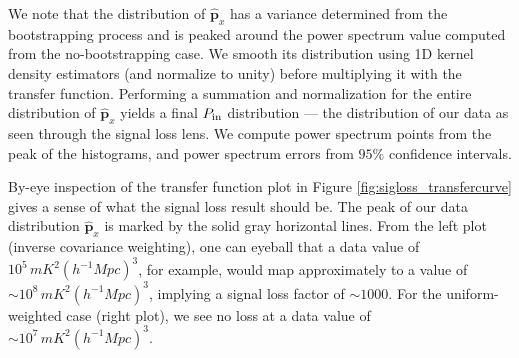 \documentclass[preprint2,numberedappendix,tighten]{aastex6}  %
\newcommand{\phat}{\widehat{\mathbf{p}}}
\begin{document}
We note that the distribution of $\phat_{x}$ has a variance determined from the bootstrapping process and is peaked around the power spectrum value computed from the no-bootstrapping case. We smooth its distribution using 1D kernel density estimators (and normalize to unity) before multiplying it with the transfer function. Performing a summation and normalization for the entire distribution of $\phat_{x}$ yields a final $P_{\rm in}$ distribution --- the distribution of our data as seen through the signal loss lens. We compute power spectrum points from the peak of the histograms, and power spectrum errors from $95\%$ confidence intervals. 

By-eye inspection of the transfer function plot in Figure \ref{fig:sigloss_transfercurve} gives a sense of what the signal loss result should be. The peak of our data distribution $
\widehat{\textbf{p}}_{x}$ is marked by the solid gray horizontal lines. From the left plot (inverse covariance weighting), one can eyeball that a data value of $10^{5} \, mK^{2} (h^{-1} Mpc)^{3}$, for example, would map approximately to a 
value of $\sim10^{8} \, mK^{2} (h^{-1} Mpc)^{3}$, implying a signal loss factor of $\sim1000$. For the uniform-weighted case (right plot), we see no loss at a data value of $\sim10^{7} \, mK^{2} (h^{-1} Mpc)^{3}$.
\end{document}
